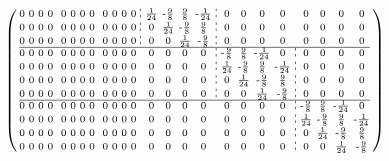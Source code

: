 \documentclass[pdftex,a4paper,parskip,listof=totoc,bibliography=totoc,onehalfspacing,12pt]{scrreprt}
\newcommand*\dashline{\hspace{-0.3em}\rotatebox[origin=c]{90}{\scalebox{-0.3}[1]{$-~~-$}}\hspace{-0.3em}}
\begin{document}
\begin{align*}
\begin{psmallmatrix}
0 & 0 & 0 & 0 && 0 & 0 & 0 & 0 && 0 & 0 & 0 & 0 &\dashline& \frac{1}{24} & \text{-}\frac{9}{8} & \frac{9}{8} & \text{-}\frac{1}{24} &\dashline& 0 & 0 & 0 & 0 && 0 & 0 & 0 & 0 \\
0 & 0 & 0 & 0 && 0 & 0 & 0 & 0 && 0 & 0 & 0 & 0 &\dashline& 0 & \frac{1}{24} & \text{-}\frac{9}{8} & \frac{9}{8} &\dashline& 0 & 0 & 0 & 0 && 0 & 0 & 0 & 0 \\
0 & 0 & 0 & 0 && 0 & 0 & 0 & 0 && 0 & 0 & 0 & 0 &\dashline& 0 & 0 & \frac{1}{24} & \text{-}\frac{9}{8} &\dashline& 0 & 0 & 0 & 0 && 0 & 0 & 0 & 0 \\\hline
0 & 0 & 0 & 0 && 0 & 0 & 0 & 0 && 0 & 0 & 0 & 0 && 0 & 0 & 0 & 0 &\dashline& \text{-}\frac{9}{8} & \frac{9}{8} & \text{-}\frac{1}{24} & 0 &\dashline& 0 & 0 & 0 & 0 \\
0 & 0 & 0 & 0 && 0 & 0 & 0 & 0 && 0 & 0 & 0 & 0 && 0 & 0 & 0 & 0 &\dashline& \frac{1}{24} & \text{-}\frac{9}{8} & \frac{9}{8} & \text{-}\frac{1}{24} &\dashline& 0 & 0 & 0 & 0 \\
0 & 0 & 0 & 0 && 0 & 0 & 0 & 0 && 0 & 0 & 0 & 0 && 0 & 0 & 0 & 0 &\dashline& 0 & \frac{1}{24} & \text{-}\frac{9}{8} & \frac{9}{8} &\dashline& 0 & 0 & 0 & 0 \\
0 & 0 & 0 & 0 && 0 & 0 & 0 & 0 && 0 & 0 & 0 & 0 && 0 & 0 & 0 & 0 &\dashline& 0 & 0 & \frac{1}{24} & \text{-}\frac{9}{8} &\dashline& 0 & 0 & 0 & 0 \\\hline
0 & 0 & 0 & 0 && 0 & 0 & 0 & 0 && 0 & 0 & 0 & 0 && 0 & 0 & 0 & 0 && 0 & 0 & 0 & 0 &\dashline& \text{-}\frac{9}{8} & \frac{9}{8} & \text{-}\frac{1}{24} & 0 \\
0 & 0 & 0 & 0 && 0 & 0 & 0 & 0 && 0 & 0 & 0 & 0 && 0 & 0 & 0 & 0 && 0 & 0 & 0 & 0 &\dashline& \frac{1}{24} & \text{-}\frac{9}{8} & \frac{9}{8} & \text{-}\frac{1}{24} \\
0 & 0 & 0 & 0 && 0 & 0 & 0 & 0 && 0 & 0 & 0 & 0 && 0 & 0 & 0 & 0 && 0 & 0 & 0 & 0 &\dashline& 0 & \frac{1}{24} & \text{-}\frac{9}{8} & \frac{9}{8} \\
0 & 0 & 0 & 0 && 0 & 0 & 0 & 0 && 0 & 0 & 0 & 0 && 0 & 0 & 0 & 0 && 0 & 0 & 0 & 0 &\dashline& 0 & 0 & \frac{1}{24} & \text{-}\frac{9}{8} \\
\end{psmallmatrix}
\end{align*}
\end{document}
